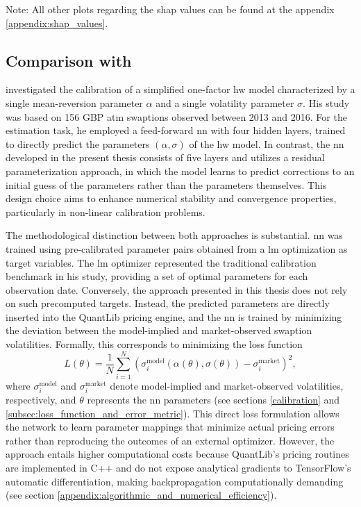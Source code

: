Note: All other plots regarding the \ac{shap} values can be found at the appendix \ref{appendix:shap_values}.

\subsection{Comparison with \textcite{hernandez2016model}}
\textcite{hernandez2016model} investigated the calibration of a simplified one-factor \ac{hw} model characterized by a single mean-reversion parameter $\alpha$ and a single volatility parameter $\sigma$. His study was based on 156 GBP \ac{atm} swaptions observed between 2013 and 2016. For the estimation task, he employed a feed-forward \ac{nn} with four hidden layers, trained to directly predict the parameters $(\alpha, \sigma)$ of the \ac{hw} model. In contrast, the \ac{nn} developed in the present thesis consists of five layers and utilizes a residual parameterization approach, in which the model learns to predict corrections to an initial guess of the parameters rather than the parameters themselves. This design choice aims to enhance numerical stability and convergence properties, particularly in non-linear calibration problems.

The methodological distinction between both approaches is substantial. \textcite{hernandez2016model} \ac{nn} was trained using pre-calibrated parameter pairs obtained from a \ac{lm} optimization as target variables. The \ac{lm} optimizer represented the traditional calibration benchmark in his study, providing a set of optimal parameters for each observation date. Conversely, the approach presented in this thesis does not rely on such precomputed targets. Instead, the predicted parameters are directly inserted into the QuantLib pricing engine, and the \ac{nn} is trained by minimizing the deviation between the model-implied and market-observed swaption volatilities. Formally, this corresponds to minimizing the loss function
\[
	L(\theta) = \frac{1}{N} \sum_{i=1}^{N} \left( \sigma^{\text{model}}_i(\alpha(\theta), \sigma(\theta)) - \sigma^{\text{market}}_i \right)^2,
\]
where $\sigma^{\text{model}}_i$ and $\sigma^{\text{market}}_i$ denote model-implied and market-observed volatilities, respectively, and $\theta$ represents the \ac{nn} parameters (see sections \ref{calibration} and \ref{subsec:loss_function_and_error_metric}). This direct loss formulation allows the network to learn parameter mappings that minimize actual pricing errors rather than reproducing the outcomes of an external optimizer. However, the approach entails higher computational costs because QuantLib's pricing routines are implemented in C++ and do not expose analytical gradients to TensorFlow's automatic differentiation, making backpropagation computationally demanding (see section \ref{appendix:algorithmic_and_numerical_efficiency}).

